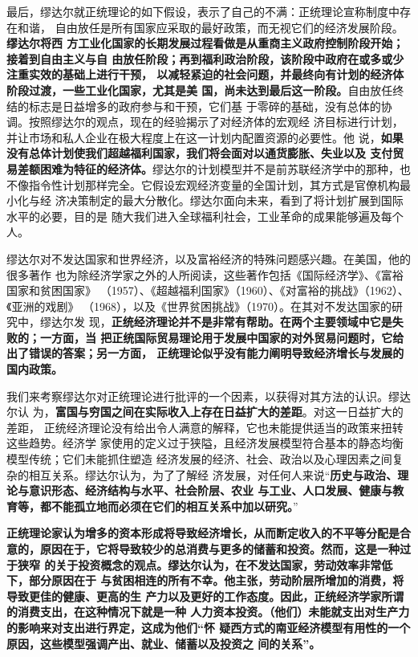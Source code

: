 最后，缪达尔就正统理论的如下假设，表示了自己的不满：正统理论宣称制度中存在和谐，
自由放任是所有国家应采取的最好政策，而无视它们的经济发展阶段。\textbf{缪达尔将西
  方工业化国家的长期发展过程看做是从重商主义政府控制阶段开始；接着到自由主义与自
  由放任阶段；再到福利政治阶段，该阶段中政府在或多或少注重实效的基础上进行干预，
  以减轻紧迫的社会问题，并最终向有计划的经济体阶段过渡，一些工业化国家，尤其是美
  国，尚未达到最后这一阶段。}自由放任终结的标志是日益增多的政府参与和干预，它们基
于零碎的基础，没有总体的协调。按照缪达尔的观点，现在的经验揭示了对经济体的宏观经
济目标进行计划，并让市场和私人企业在极大程度上在这一计划内配置资源的必要性。他
说，\textbf{如果没有总体计划使我们超越福利国家，我们将会面对以通货膨胀、失业以及
  支付贸易差额困难为特征的经济体。}缪达尔的计划模型并不是前苏联经济学中的那种，也
不像指令性计划那样完全。它假设宏观经济变量的全国计划，其方式是官僚机构最小化与经
济决策制定的最大分散化。缪达尔面向未来，看到了将计划扩展到国际水平的必要，目的是
随大我们进入全球福利社会，工业革命的成果能够遍及每个人。

缪达尔对不发达国家和世界经济，以及富裕经济的特殊问题感兴趣。在美国，他的很多著作
也为除经济学家之外的人所阅读，这些著作包括《国际经济学》、《富裕国家和贫困国家》
（1957）、《超越福利国家》（1960）、《对富裕的挑战》（1962）、《亚洲的戏剧》
（1968），以及《世界贫困挑战》（1970）。在其对不发达国家的研究中，缪达尔发
现，\textbf{正统经济理论并不是非常有帮助。在两个主要领域中它是失败的；一方面，当
  把正统国际贸易理论用于发展中国家的对外贸易问题时，它给出了错误的答案；另一方面，
  正统理论似乎没有能力阐明导致经济增长与发展的国内政策。}

我们来考察缪达尔对正统理论进行批评的一个因素，以获得对其方法的认识。缪达尔认
为，\textbf{富国与穷国之间在实际收入上存在日益扩大的差距}。对这一日益扩大的差距，
正统经济理论没有给出令人满意的解释，它也未能提供适当的政策来扭转这些趋势。经济学
家使用的定义过于狭隘，且经济发展模型符合基本的静态均衡模型传统；它们未能抓住塑造
经济发展的经济、社会、政治以及心理因素之间复杂的相互关系。缪达尔认为，为了了解经
济发展，对任何人来说“\textbf{历史与政治、理论与意识形态、经济结构与水平、社会阶层、农业
与工业、人口发展、健康与教育等，都不能孤立地而必须在它们的相互关系中加以研究。}”

\textbf{正统理论家认为增多的资本形成将导致经济增长，从而断定收入的不平等分配是合
  意的，原因在于，它将导致较少的总消费与更多的储蓄和投资。然而，这是一种过于狭窄
  的关于投资概念的观点。缪达尔认为，在不发达国家，劳动效率非常低下，部分原因在于
  与贫困相连的所有不幸。他主张，劳动阶层所增加的消费，将导致更佳的健康、更高的生
  产力以及更好的工作态度。因此，正统经济学家所谓的消费支出，在这种情况下就是一种
  人力资本投资。（他们）未能就支出对生产力的影响来对支出进行界定，这成为他们“怀
  疑西方式的南亚经济模型有用性的一个原因，这些模型强调产出、就业、储蓄以及投资之
  间的关系”。}

